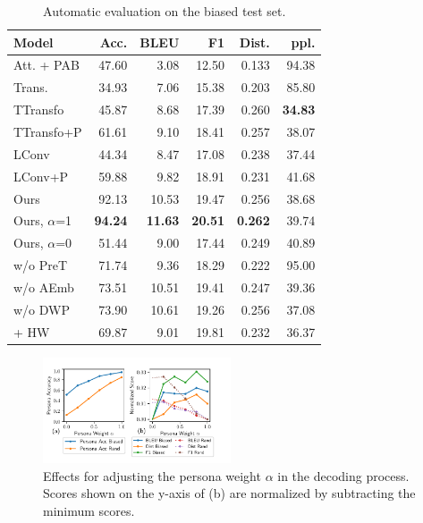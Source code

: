 \documentclass[letterpaper]{article}
\begin{document}
\begin{table}[!t]
\centering
\caption{Automatic evaluation on the biased test set.}
\begin{tabular}{lrrrrr}
\toprule
Model             &  Acc.          &     BLEU       &    F1          &   Dist.        &    ppl.        \\
\midrule
Att. + PAB        &   47.60        &     3.08       &     12.50      &   0.133        &    94.38       \\
Trans.            &   34.93        &     7.06       &     15.38      &   0.203        &    85.80       \\
TTransfo          &   45.87        &     8.68       &     17.39      &   0.260        & \textbf{34.83} \\
TTransfo+P        &   61.61        &     9.10       &     18.41      &   0.257        &    38.07       \\
LConv             &   44.34        &     8.47       &     17.08      &   0.238        &    37.44       \\
LConv+P           &   59.88        &     9.82       &     18.91      &   0.231        &    41.68       \\
\midrule
Ours              &   92.13        &     10.53      &     19.47      &   0.256        &    38.68       \\
Ours, $\alpha$=1  & \textbf{94.24} & \textbf{11.63} & \textbf{20.51} & \textbf{0.262} &    39.74       \\
Ours, $\alpha$=0  &   51.44        &     9.00       &     17.44      &   0.249        &    40.89       \\
w/o PreT          &   71.74        &     9.36       &     18.29      &   0.222        &    95.00       \\
w/o AEmb          &   73.51        &     10.51      &     19.41      &   0.247        &    39.36       \\
w/o DWP           &   73.90        &     10.61      &     19.26      &   0.256        &    37.08       \\
\quad + HW        &   69.87        &     9.01       &     19.81      &   0.232        &    36.37       \\
\bottomrule
\end{tabular}
\label{tab:bias_result}
\end{table}

\begin{figure}[thbp!]
  \centering
  \includegraphics[width=210px]{figures/adjust_w.pdf}
  \caption{Effects for adjusting the persona weight $\alpha$ in the decoding process. Scores shown on the y-axis of (b) are normalized by subtracting the minimum scores.}
  \label{fig:adjust_w}
\end{figure}
\end{document}
